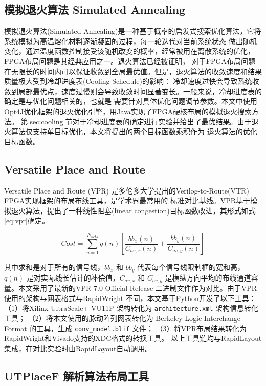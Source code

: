 \subsection{模拟退火算法 Simulated Annealing}
\label{sec:sa}

模拟退火算法(Simulated Annealing)是一种基于概率的启发式搜索优化算法，它将系统模拟为高温熔化材料逐渐凝固的过程，每一轮迭代对当前系统状态
做出随机变化，通过温度函数控制接受该随机改变的概率，经常被用在离散系统的优化，FPGA布局问题是其经典应用之一。退火算法已经被证明，
对于FPGA布局问题在无限长的时间内可以保证收敛到全局最优值。但是，退火算法的收敛速度和结果质量极大受到冷却进度表(Cooling Schedule)的影响：
冷却速度过快会导致系统收敛到局部最优点，速度过慢则会导致收敛时间显著变长。一般来说，冷却进度表的确定是与优化问题相关的，也就是
需要针对具体优化问题调节参数。本文中使用Opt4J优化框架的退火优化引擎，用Java实现了FPGA硬核布局的模拟退火搜索方法。
第\ref{sec:cooling}节对于冷却进度表的确定进行实验并给出了最优结果。由于退火算法仅支持单目标优化，本文将提出的两个目标函数乘积作为
退火算法的优化目标函数。

\subsection{Versatile Place and Route}

Versatile Place and Route (VPR) 是多伦多大学提出的Verilog-to-Route(VTR) FPGA实现框架的布局布线工具，是学术界最常用的
标准对比基线。VPR基于模拟退火算法，提出了一种线性阻塞(linear congestion)目标函数改进，其形式如式\ref{eq:vpr}确定。

\begin{equation}
Cost = \sum_{n=1}^{N_{nets}} q(n) [ \frac{bb_x(n)}{C_{av,x}(n)} + \frac{bb_y(n)}{C_{av,y}(n)} ] 
\label{eq:vpr}
\end{equation}

其中求和是对于所有的信号线，$bb_x$ 和 $bb_y$ 代表每个信号线限制框的宽和高，$q(n)$ 是对实际线长估计的补偿值，$C_{av,x}$ 和 $C_{av,y}$
是横纵方向平均的布线通道容量。本文采用了最新的VPR 7.0 Official Release 二进制文件作为对比。由于VPR使用的架构与网表格式与RapidWright
不同，本文基于Python开发了以下工具：（1）将Xilinx UltraScale+ VU11P 架构转化为 \texttt{architecture.xml} 架构信息转化工具；
（2）将本文使用的脉动阵列网表转化为 Berkeley Logic Interchange Format 的工具，生成 \texttt{conv\_model.blif} 文件；
（3）将VPR布局结果转化为RapidWright和Vivado支持的XDC格式的转换工具。
以上工具链均与RapidLayout集成，在对比实验时由RapidLayout自动调用。

\subsection{UTPlaceF 解析算法布局工具}

